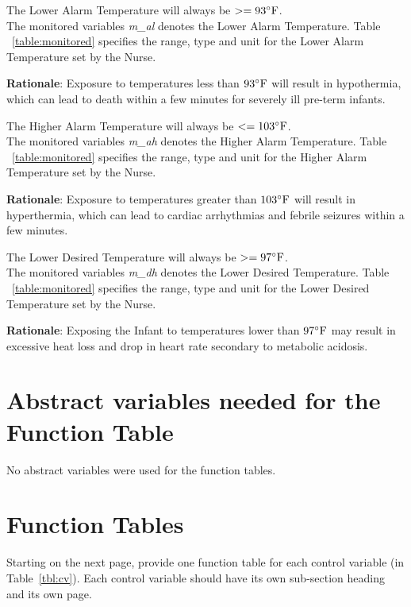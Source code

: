 \documentclass[fontsize=12pt,paper=letter,twoside]{scrartcl}
\begin{document}
\edescription
{The Lower Alarm Temperature will always be $ >= 93^{\circ}\mathrm{F}$.\\}
{The monitored variables \emph{m\_al} denotes the Lower Alarm Temperature. Table ~\ref{table:monitored} specifies the range, type and unit for the Lower Alarm Temperature set by the Nurse.}
\label{E3}

\smallskip
\noindent \textbf{Rationale}: Exposure to temperatures less than $93^{\circ}\mathrm{F}$ will result in hypothermia, which can lead to death within a few minutes for severely ill pre-term infants.

\edescription
{The Higher Alarm Temperature will always be $ <= 103^{\circ}\mathrm{F}$.\\}
{The monitored variables \emph{m\_ah} denotes the Higher Alarm Temperature. Table ~\ref{table:monitored} specifies the range, type and unit for the Higher Alarm Temperature set by the Nurse.}
\label{E4}

\smallskip
\noindent \textbf{Rationale}: Exposure to temperatures greater than $103^{\circ}\mathrm{F}$ will result in hyperthermia, which can lead to cardiac arrhythmias and febrile seizures within a few minutes.

\edescription
{The Lower Desired Temperature will always be $ >= 97^{\circ}\mathrm{F}$.\\}
{The monitored variables \emph{m\_dh} denotes the Lower Desired Temperature. Table ~\ref{table:monitored} specifies the range, type and unit for the Lower Desired Temperature set by the Nurse.}
\label{E5}

\smallskip
\noindent \textbf{Rationale}: Exposing the Infant to temperatures lower than $97^{\circ}\mathrm{F}$ may result in excessive heat loss and drop in heart rate secondary to metabolic acidosis.


\newpage
\section{Abstract variables needed for the Function Table}

No abstract variables were used for the function tables.


\section{Function Tables}

Starting on the next page, provide one function table for each control variable (in Table~\ref{tbl:cv}). Each control variable should have its own sub-section heading and its own page.
\end{document}
